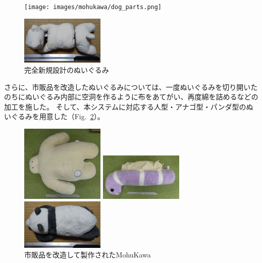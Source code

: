 \documentclass[uplatex,a4paper,12pt]{jsarticle}
\renewcommand{\figurename}{Fig.}
\newcommand{\figref}[1]{\figurename~\ref{#1}}
\begin{document}
\begin{figure}[htbp]
  \centering
  \begin{minipage}[c]{0.64\linewidth}
    \centering
    \texttt{[image: images/mohukawa/dog\_parts.png]}
  \end{minipage}
  \begin{minipage}[c]{0.32\linewidth}
    \centering
    \includegraphics[keepaspectratio,width=4cm,clip]{images/mohukawa/dog.jpg}
  \end{minipage}
  \caption{完全新規設計のぬいぐるみ}
  \label{fig:mohukawa:dog}
\end{figure}

さらに、市販品を改造したぬいぐるみについては、一度ぬいぐるみを切り開いたのちにぬいぐるみ内部に空洞を作るように布をあてがい、再度綿を詰めるなどの加工を施した。
そして、本システムに対応する人型・アナゴ型・パンダ型のぬいぐるみを用意した（\figref{fig:mohukawa:funio_anago_panda}）。

\begin{figure}[htbp]
  \centering
  \begin{minipage}[c]{0.32\linewidth}
    \centering
    \includegraphics[keepaspectratio,width=4cm,clip]{images/mohukawa/funio.jpg}
  \end{minipage}
  \begin{minipage}[c]{0.32\linewidth}
    \centering
    \includegraphics[keepaspectratio,width=4cm,clip]{images/mohukawa/anago.jpg}
  \end{minipage}
  \begin{minipage}[c]{0.32\linewidth}
    \centering
    \includegraphics[keepaspectratio,width=4cm,clip]{images/mohukawa/panda.jpg}
  \end{minipage}
  \caption{市販品を改造して製作されたMohuKawa}
  \label{fig:mohukawa:funio_anago_panda}
\end{figure}
\end{document}
